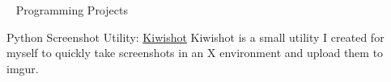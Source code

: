 

\begin{cventries}

%
	\cventry
	{~}
	{Programming Projects}
	{}
	{}
	{
		\begin{cvitems}
		\item {Python Screenshot Utility: \href{https://github.com/AJubatus/Kiwishot}{Kiwishot}
			Kiwishot is a small utility I created for myself to quickly take screenshots in an X environment and upload them to imgur.}
		\end{cvitems}
		}


\end{cventries}
